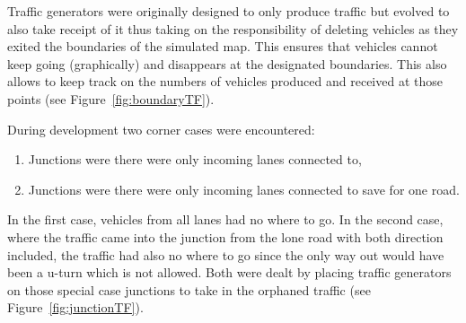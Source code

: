 Traffic generators were originally designed to only produce traffic but evolved to also take receipt of it thus taking on the responsibility of deleting vehicles as they exited the boundaries of the simulated map. This ensures that vehicles cannot keep going (graphically) and disappears at the designated boundaries. This also allows to keep track on the numbers of vehicles produced and received at those points (see Figure~\ref{fig:boundaryTF}).

During development two corner cases were encountered:
\begin{enumerate}
	\item Junctions were there were only incoming lanes connected to,
	\item Junctions were there were only incoming lanes connected to save for one road.
\end{enumerate}

In the first case, vehicles from all lanes had no where to go. In the second case, where the traffic came into the junction from the lone road with both direction included, the traffic had also no where to go since the only way out would have been a u-turn which is not allowed.
Both were dealt by placing traffic generators on those special case junctions to take in the orphaned traffic (see Figure~\ref{fig:junctionTF}).

